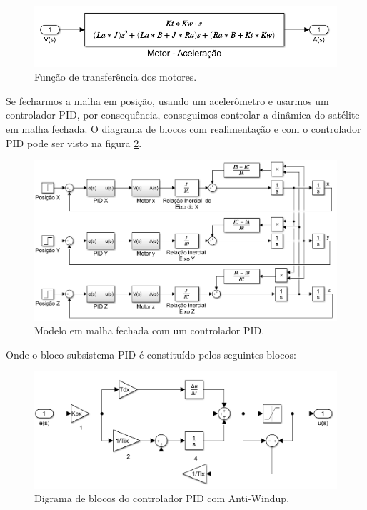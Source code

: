 \begin{figure}[H]
  \caption{Função de transferência dos motores.}
  \begin{center}
      \includegraphics[scale=.6]{metodologia/img/modelo_satelite_motor}
  \end{center}
  \label{fig:modelo_satelite_motor}
\end{figure}

Se fecharmos a malha em posição, usando um acelerômetro e usarmos um controlador PID, por consequência, conseguimos controlar a dinâmica do satélite em malha fechada. O diagrama de blocos com realimentação e com o controlador PID pode ser visto na figura \ref{fig:modelo_satelite_pid}. 

\begin{figure}[H]
  \caption{Modelo em malha fechada com um controlador PID.}
  \begin{center}
      \includegraphics[scale=.6]{metodologia/img/modelo_satelite_pid}
  \end{center}
  \label{fig:modelo_satelite_pid}
\end{figure}

Onde o bloco subsistema PID é constituído pelos seguintes blocos:

\begin{figure}[H]
  \caption{Digrama de blocos do controlador PID com Anti-Windup.}
  \begin{center}
      \includegraphics[scale=.55]{metodologia/img/matlab_pid_antiwindup}
  \end{center}
  \label{fig:simulink_modelo_completo_aberto}
\end{figure}


